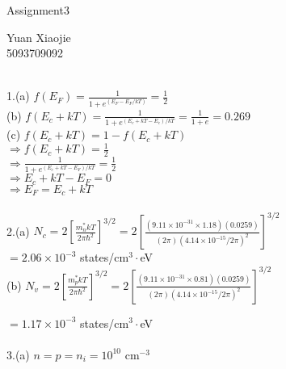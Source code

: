 \documentclass[11pt,oneside,a4paper]{article}
\begin{document}
\begin{center}Assignment3\\\end{center} 
\begin{flushright}Yuan Xiaojie\\5093709092\\\end{flushright} 

\ \\

1.\:(a) \(f(E_F)=\frac{1}{1+e^{(E_F-E_F/kT)}}=\frac{1}{2}\) \\ 

\quad (b) \(f(E_c+kT)=\frac{1}{1+e^{(E_c+kT-E_c)/kT}}=\frac{1}{1+e}=0.269\) \\

\quad (c) \(f(E_c+kT)=1-f(E_c+kT)\) \\

\hspace{8.5mm} \(\Rightarrow f(E_c+kT)=\frac{1}{2}\) \\

\hspace{8.5mm} \(\Rightarrow \frac{1}{1+e^{(E_c+kT-E_F)/kT}}=\frac{1}{2}\) \\

\hspace{8.5mm} \(\Rightarrow E_c+kT-E_F=0\) \\

\hspace{8.5mm} \(\Rightarrow E_F=E_c+kT \) \\
\\

2.\:(a) \(N_c=2\left[\frac{m_n^*kT}{2\pi\hbar^2}\right]^{3/2} = 2\left[\frac{(9.11\times10^{-31}\times1.18)(0.0259)}{(2\pi)(4.14\times10^{-15}/2\pi)^2}\right]^{3/2}\) \\

\hspace{15mm} \(=2.06\times10^{-3}\) states/cm\(^3\cdot\)eV \\

\quad (b) \(N_v=2\left[\frac{m_p^*kT}{2\pi\hbar^2}\right]^{3/2}=2\left[\frac{(9.11\times10^{-31}\times0.81)(0.0259)}{(2\pi)(4.14\times10^{-15}/2\pi)^2}\right]^{3/2}\)

\hspace{15mm} \(=1.17\times10^{-3}\) states/cm\(^3\cdot\)eV \\
\\

3.\:(a) \(n=p=n_i=10^{10}\) cm\(^{-3}\) \\
\end{document}
